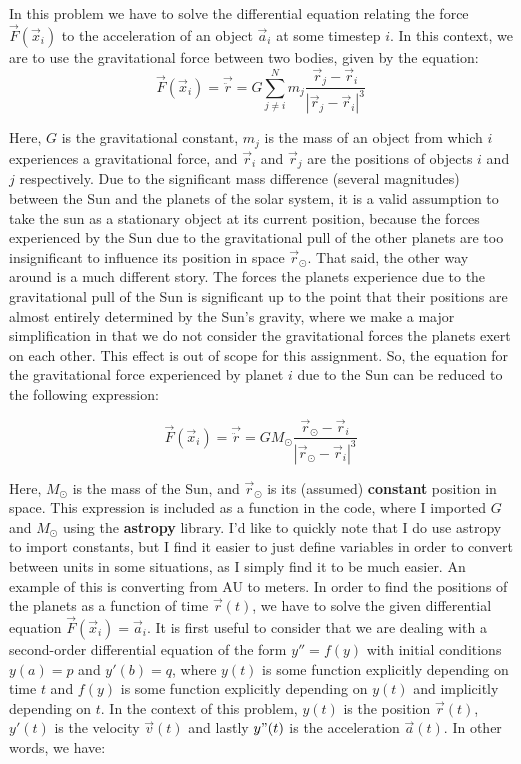 In this problem we have to solve the differential equation relating the force $\vec{F}(\vec{x}_i)$ to the acceleration of an object $\vec{a}_i$ at some timestep $i$. In this context, we are to use the gravitational force between two bodies, given by the equation:\\

\begin{equation}
\vec{F}(\vec{x}_i) = \vec{\ddot{r}} = G \sum_{j \neq i}^N m_j \frac{\vec{r}_j - \vec{r}_i}{|\vec{r}_j - \vec{r}_i|^3}
\end{equation}

Here, $G$ is the gravitational constant, $m_j$ is the mass of an object from which $i$ experiences a gravitational force, and $\vec{r}_i$ and $\vec{r}_j$ are the positions of objects $i$ and $j$ respectively. Due to the significant mass difference (several magnitudes) between the Sun and the planets of the solar system, it is a valid assumption to take the sun as a stationary object at its current position, because the forces experienced by the Sun due to the gravitational pull of the other planets are too insignificant to influence its position in space $\vec{r}_{\odot}$. That said, the other way around is a much different story. The forces the planets experience due to the gravitational pull of the Sun is significant up to the point that their positions are almost entirely determined by the Sun's gravity, where we make a major simplification in that we do not consider the gravitational forces the planets exert on each other. This effect is out of scope for this assignment. So, the equation for the gravitational force experienced by planet $i$ due to the Sun can be reduced to the following expression:

\begin{equation}
\vec{F}(\vec{x}_i) = \vec{\ddot{r}} = G M_{\odot} \frac{\vec{r}_{\odot} - \vec{r}_i}{|\vec{r}_{\odot} - \vec{r}_i|^3}
\end{equation}

Here, $M_{\odot}$ is the mass of the Sun, and $\vec{r}_{\odot}$ is its (assumed) \textbf{constant} position in space. This expression is included as a function in the code, where I imported $G$ and $M_{\odot}$ using the \textbf{astropy} library. I'd like to quickly note that I do use astropy to import constants, but I find it easier to just define variables in order to convert between units in some situations, as I simply find it to be much easier. An example of this is converting from AU to meters. In order to find the positions of the planets as a function of time $\vec{r}(t)$, we have to solve the given differential equation $\vec{F}(\vec{x}_i) = \vec{a}_i$. It is first useful to consider that we are dealing with a second-order differential equation of the form $y'' = f(y)$ with initial conditions $y(a) = p$ and $y'(b) = q$, where $y(t)$ is some function explicitly depending on time $t$ and $f(y)$ is some function explicitly depending on $y(t)$ and implicitly depending on $t$. In the context of this problem, $y(t)$ is the position $\vec{r}(t)$, $y'(t)$ is the velocity $\vec{v}(t)$ and lastly $y"(t)$ is the acceleration $\vec{a}(t)$. In other words, we have:

